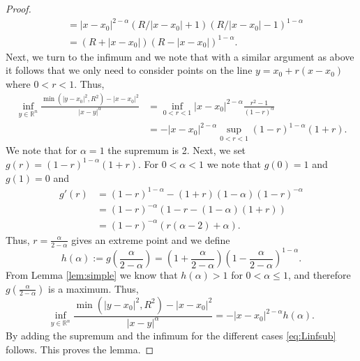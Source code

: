 \documentclass[11pt]{article}
\providecommand{\Rn}{\mathbb{R}^n}
\numberwithin{equation}{section}
\theoremstyle{definition}
\begin{document}
\begin{proof}
\begin{align*}
          &= |x-x_0|^{2-\alpha} \left(R/|x-x_0| +1\right)\left(R/|x-x_0| -1\right)^{1-\alpha}\\
          &= \left(R+|x-x_0| \right)  \left(R-|x-x_0| \right)^{1-\alpha}.
     \end{align*}
     Next, we turn to the infimum and we note that with a similar argument as above it follows that we only need to consider points on the line $y =x_0+r(x-x_0)$ where $0<r<1$. Thus,
     \begin{align*}
         \inf_{y \in \Rn} \frac{\min(|y-x_0|^2, R^2)-|x-x_0|^2}{|x-y|^{\alpha}} &= \inf_{0<r<1} |x-x_0|^{2-\alpha}\frac{r^2-1}{(1-r)^{\alpha}} \\
         &= - |x-x_0|^{2-\alpha} \sup_{0<r<1} (1-r)^{1-\alpha}(1+r).
     \end{align*}
     We note that for $\alpha=1$ the supremum is 2. Next, we set $g(r) = (1-r)^{1-\alpha}(1+r)$. For $0<\alpha<1$ we note that $g(0)=1$ and $g(1)=0$ and 
     \begin{align*}
         g'(r)&= (1-r)^{1-\alpha} -(1+r)(1-\alpha)(1-r)^{-\alpha} \\
         &=(1-r)^{-\alpha}\left(1-r -(1-\alpha)(1+r) \right) \\
         &= (1-r)^{-\alpha}\left(r(\alpha-2)+\alpha \right).
     \end{align*}
     Thus, $r=\frac{\alpha}{2-\alpha}$ gives an extreme point and we define 
     $$
    h(\alpha):= g\left(\frac{\alpha}{2-\alpha}\right)= \left(1+\frac{\alpha}{2-\alpha} \right)\left(1-\frac{\alpha}{2-\alpha} \right)^{1-\alpha}.
    $$
    From Lemma \ref{lem:simple} we know that $h(\alpha)>1$ for $0<\alpha \leq1$, and therefore $g\left(\frac{\alpha}{2-\alpha}\right)$ is a maximum. Thus,
    \begin{equation*}
         \inf_{y \in \Rn} \frac{\min(|y-x_0|^2, R^2)-|x-x_0|^2}{|x-y|^{\alpha}}=  - |x-x_0|^{2-\alpha} h(\alpha).
    \end{equation*}
     By adding the supremum and the infimum for the different cases \eqref{eq:Linfsub} follows. This proves the lemma.
     \end{proof}
\end{document}
